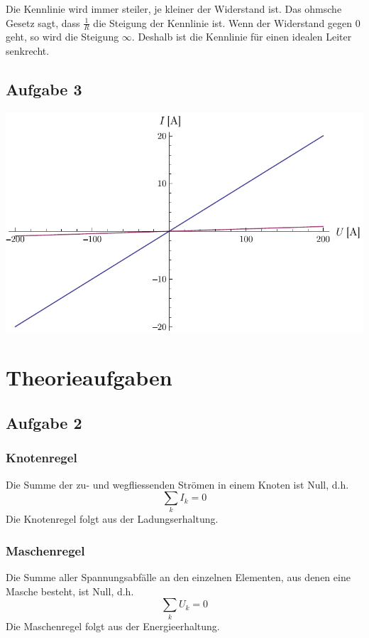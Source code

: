 \documentclass[12pt,a4paper]{article}
\begin{document}
Die Kennlinie wird immer steiler, je kleiner der Widerstand ist. Das ohmsche Gesetz sagt, dass $\frac{1}{R}$ die Steigung der Kennlinie ist. Wenn der Widerstand gegen $0$ geht, so wird die Steigung $\infty$. Deshalb ist die Kennlinie f\"ur einen idealen Leiter senkrecht.

\subsection*{Aufgabe 3}
\includegraphics[width=15cm]{ohm.pdf}


\newpage
\section*{Theorieaufgaben}

\subsection*{Aufgabe 2}
\subsubsection*{Knotenregel}
Die Summe der zu- und wegfliessenden Str\"omen in einem Knoten ist Null, d.h.
\[ \sum_kI_k = 0 \]
Die Knotenregel folgt aus der Ladungserhaltung.

\subsubsection*{Maschenregel}
Die Summe aller Spannungsabf\"alle an den einzelnen Elementen, aus denen eine Masche besteht, ist Null, d.h.
\[ \sum_kU_k = 0\]
Die Maschenregel folgt aus der Energieerhaltung.
\end{document}
